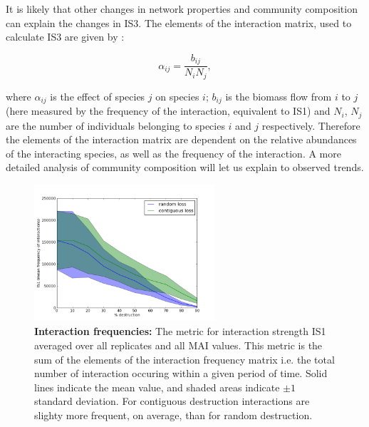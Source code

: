 It is likely that other changes in network properties and community composition can explain the changes in IS3. The elements of the interaction matrix, used to calculate IS3 are given by \cite{wootton2005measurement, berlow2004interaction}:

\begin{equation}
\alpha_{ij} = \frac{b_{ij}}{N_i N_j},
\end{equation} 

where $\alpha_{ij}$ is the effect of species $j$ on species $i$; $b_{ij}$ is the biomass flow from $i$ to $j$ (here measured by the frequency of the interaction, equivalent to IS1) and $N_i$, $N_j$ are the number of individuals belonging to species $i$ and $j$ respectively. Therefore the elements of the interaction matrix are dependent on the relative abundances of the interacting species, as well as the frequency of the interaction. A more detailed analysis of community composition will let us explain to observed trends.    





 

    
\begin{figure} 
		\centering      
        \includegraphics[width=0.6\textwidth]{"comparison_plots/comparing_mean_IS1"}
        \caption{\textbf{Interaction frequencies:} The metric for interaction strength IS1 averaged over all replicates and all MAI values. This metric is the sum of the elements of the interaction frequency matrix i.e. the total number of interaction occuring within a given period of time. Solid lines indicate the mean value, and shaded areas indicate $\pm 1$ standard deviation. For contiguous destruction interactions are slighty more frequent, on average, than for random destruction.}\label{fig:IS1}
\end{figure}

